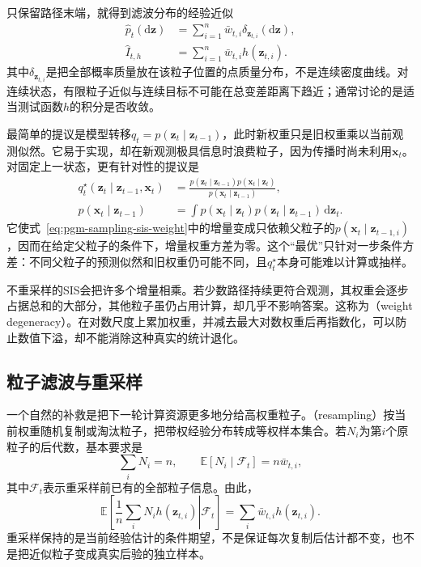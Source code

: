 只保留路径末端，就得到滤波分布的经验近似
\begin{equation}
  \begin{aligned}
    \widehat p_t(\mathrm{d}\bm{z})
      &=\sum_{i=1}^{n}\bar w_{t,i}\delta_{\bm{z}_{t,i}}(\mathrm{d}\bm{z}),\\
    \widehat I_{t,h}&=\sum_{i=1}^{n}\bar w_{t,i}h(\bm{z}_{t,i}).
  \end{aligned}
  \label{eq:pgm-sampling-particle-measure}
\end{equation}
其中$\delta_{\bm{z}_{t,i}}$是把全部概率质量放在该粒子位置的点质量分布，不是连续密度曲线。对连续状态，有限粒子近似与连续目标不可能在总变差距离下趋近；通常讨论的是适当测试函数$h$的积分是否收敛。

最简单的提议是模型转移$q_t=p(\bm{z}_t\mid\bm{z}_{t-1})$，此时新权重只是旧权重乘以当前观测似然。它易于实现，却在新观测极具信息时浪费粒子，因为传播时尚未利用$\bm{x}_t$。对固定上一状态，更有针对性的提议是
\begin{equation}
  \begin{aligned}
    q_t^\star(\bm{z}_t\mid\bm{z}_{t-1},\bm{x}_t)
      &=\frac{p(\bm{z}_t\mid\bm{z}_{t-1})
                p(\bm{x}_t\mid\bm{z}_t)}
              {p(\bm{x}_t\mid\bm{z}_{t-1})},\\
    p(\bm{x}_t\mid\bm{z}_{t-1})
      &=\int p(\bm{x}_t\mid\bm{z}_t)
             p(\bm{z}_t\mid\bm{z}_{t-1})\,\mathrm{d}\bm{z}_t.
  \end{aligned}
  \label{eq:pgm-sampling-optimal-proposal}
\end{equation}
它使式~\eqref{eq:pgm-sampling-sis-weight}中的增量变成只依赖父粒子的$p(\bm{x}_t\mid\bm{z}_{t-1,i})$，因而在给定父粒子的条件下，增量权重方差为零。这个“最优”只针对一步条件方差：不同父粒子的预测似然和旧权重仍可能不同，且$q_t^\star$本身可能难以计算或抽样。

不重采样的SIS会把许多个增量相乘。若少数路径持续更符合观测，其权重会逐步占据总和的大部分，其他粒子虽仍占用计算，却几乎不影响答案。这称为（weight degeneracy）。在对数尺度上累加权重，并减去最大对数权重后再指数化，可以防止数值下溢，却不能消除这种真实的统计退化。

\subsection{粒子滤波与重采样}
\label{sec:pgm-sampling-particle-filter}

一个自然的补救是把下一轮计算资源更多地分给高权重粒子。（resampling）按当前权重随机复制或淘汰粒子，把带权经验分布转成等权样本集合。若$N_i$为第$i$个原粒子的后代数，基本要求是
\begin{equation}
  \sum_i N_i=n,\qquad
  \mathbb{E}[N_i\mid\mathcal{F}_t]=n\bar w_{t,i},
  \label{eq:pgm-sampling-offspring}
\end{equation}
其中$\mathcal{F}_t$表示重采样前已有的全部粒子信息。由此，
\[
  \mathbb{E}\left[
     \left.\frac1n\sum_i N_i h(\bm{z}_{t,i})\right|\mathcal{F}_t
  \right]
    =\sum_i\bar w_{t,i}h(\bm{z}_{t,i}).
\]
重采样保持的是当前经验估计的条件期望，不是保证每次复制后估计都不变，也不是把近似粒子变成真实后验的独立样本。

